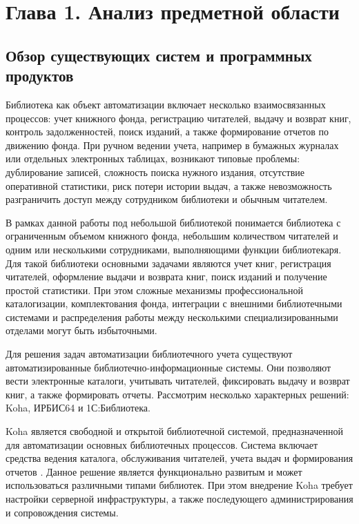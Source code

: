 \section*{Глава 1. Анализ предметной области}

\subsection{Обзор существующих систем и программных продуктов}

Библиотека как объект автоматизации включает несколько взаимосвязанных процессов:
учет книжного фонда, регистрацию читателей, выдачу и возврат книг, контроль
задолженностей, поиск изданий, а также формирование отчетов по движению фонда.
При ручном ведении учета, например в бумажных журналах или отдельных электронных
таблицах, возникают типовые проблемы: дублирование записей, сложность поиска
нужного издания, отсутствие оперативной статистики, риск потери истории выдач,
а также невозможность разграничить доступ между сотрудником библиотеки и обычным
читателем.

В рамках данной работы под небольшой библиотекой понимается библиотека с
ограниченным объемом книжного фонда, небольшим количеством читателей и одним или
несколькими сотрудниками, выполняющими функции библиотекаря. Для такой библиотеки
основными задачами являются учет книг, регистрация читателей, оформление выдачи и
возврата книг, поиск изданий и получение простой статистики. При этом сложные
механизмы профессиональной каталогизации, комплектования фонда, интеграции с
внешними библиотечными системами и распределения работы между несколькими
специализированными отделами могут быть избыточными.

Для решения задач автоматизации библиотечного учета существуют
автоматизированные библиотечно-информационные системы. Они позволяют вести
электронные каталоги, учитывать читателей, фиксировать выдачу и возврат книг,
а также формировать отчеты. Рассмотрим несколько характерных решений: Koha,
ИРБИС64 и 1С:Библиотека.

Koha является свободной и открытой библиотечной системой, предназначенной для
автоматизации основных библиотечных процессов. Система включает средства ведения
каталога, обслуживания читателей, учета выдач и формирования отчетов
\cite{koha_community}. Данное решение является функционально развитым и может
использоваться различными типами библиотек. При этом внедрение Koha требует
настройки серверной инфраструктуры, а также последующего администрирования и
сопровождения системы.

